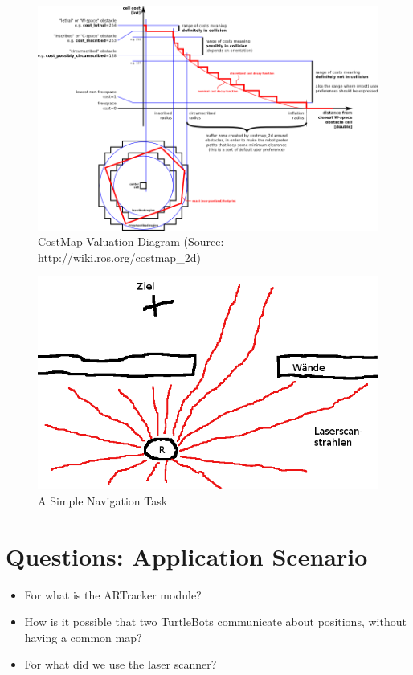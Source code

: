 \begin{figure}[htbp]
 \includegraphics[width=\textwidth]{pic/costmapspec.png}
 \caption{CostMap Valuation Diagram (Source: http://wiki.ros.org/costmap\_2d)}
 \label{fig:costmap}
\end{figure}

\begin{figure}[htbp]
 \includegraphics[width=\textwidth]{pic/simple_nav.png}
 \caption{A Simple Navigation Task}
 \label{fig:nav_task}
\end{figure}


\section{Questions: Application Scenario}
\label{sec:questions_app_scenario}

\begin{itemize}
 \item For what is the ARTracker module?
 \item How is it possible that two TurtleBots communicate about positions, without having a common map?
 \item For what did we use the laser scanner?
\end{itemize}


